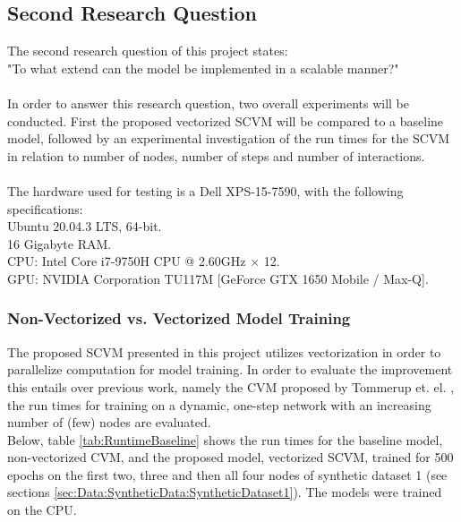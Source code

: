 \subsection{Second Research Question}
\label{sec:ResearchQuestion2}
The second research question of this project states:
\\
"To what extend can the model be implemented in a scalable manner?"
\\\\
In order to answer this research question, two overall experiments will be conducted.
First the proposed vectorized SCVM will be compared to a baseline model, followed by an experimental investigation of the run times for the SCVM in relation to number of nodes, number of steps and number of interactions.
\\\\
The hardware used for testing is a Dell XPS-15-7590, with the following specifications:
\\
Ubuntu 20.04.3 LTS, 64-bit.
\\
16 Gigabyte RAM.
\\
CPU: Intel Core i7-9750H CPU @ 2.60GHz × 12.
\\
GPU: NVIDIA Corporation TU117M [GeForce GTX 1650 Mobile / Max-Q].


\subsubsection{Non-Vectorized vs. Vectorized Model Training}
\label{sec:ResearchQuestion2:BaselineComparison}
The proposed SCVM presented in this project utilizes vectorization in order to parallelize computation for model training.
In order to evaluate the improvement this entails over previous work, namely the CVM proposed by Tommerup et. el. \cite{Tommerup2021LearningNetworks}, the run times for training on a dynamic, one-step network with an increasing number of (few) nodes are evaluated.
\\
Below, table \ref{tab:RuntimeBaseline} shows the run times for the baseline model, non-vectorized CVM, and the proposed model, vectorized SCVM, trained for 500 epochs on the first two, three and then all four nodes of synthetic dataset 1 (see sections \ref{sec:Data:SyntheticData:SyntheticDataset1}).
The models were trained on the CPU.

